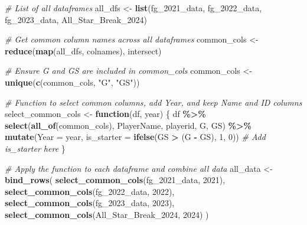 \documentclass[
]{article}
\newenvironment{Shaded}{\begin{snugshade}}{\end{snugshade}}
\newcommand{\AttributeTok}[1]{\textcolor[rgb]{0.13,0.29,0.53}{#1}}
\newcommand{\CommentTok}[1]{\textcolor[rgb]{0.56,0.35,0.01}{\textit{#1}}}
\newcommand{\ControlFlowTok}[1]{\textcolor[rgb]{0.13,0.29,0.53}{\textbf{#1}}}
\newcommand{\DecValTok}[1]{\textcolor[rgb]{0.00,0.00,0.81}{#1}}
\newcommand{\FunctionTok}[1]{\textcolor[rgb]{0.13,0.29,0.53}{\textbf{#1}}}
\newcommand{\NormalTok}[1]{#1}
\newcommand{\OtherTok}[1]{\textcolor[rgb]{0.56,0.35,0.01}{#1}}
\newcommand{\SpecialCharTok}[1]{\textcolor[rgb]{0.81,0.36,0.00}{\textbf{#1}}}
\newcommand{\StringTok}[1]{\textcolor[rgb]{0.31,0.60,0.02}{#1}}
\begin{document}
\begin{Shaded}
\begin{Highlighting}[]
\CommentTok{\# List of all dataframes}
\NormalTok{all\_dfs }\OtherTok{\textless{}{-}} \FunctionTok{list}\NormalTok{(fg\_2021\_data, fg\_2022\_data, fg\_2023\_data, All\_Star\_Break\_2024)}
\end{Highlighting}
\end{Shaded}

\begin{Shaded}
\begin{Highlighting}[]
\CommentTok{\# Get common column names across all dataframes}
\NormalTok{common\_cols }\OtherTok{\textless{}{-}} \FunctionTok{reduce}\NormalTok{(}\FunctionTok{map}\NormalTok{(all\_dfs, colnames), intersect)}
\end{Highlighting}
\end{Shaded}

\begin{Shaded}
\begin{Highlighting}[]
\CommentTok{\# Ensure G and GS are included in common\_cols}
\NormalTok{common\_cols }\OtherTok{\textless{}{-}} \FunctionTok{unique}\NormalTok{(}\FunctionTok{c}\NormalTok{(common\_cols, }\StringTok{"G"}\NormalTok{, }\StringTok{"GS"}\NormalTok{))}
\end{Highlighting}
\end{Shaded}

\begin{Shaded}
\begin{Highlighting}[]
\CommentTok{\# Function to select common columns, add Year, and keep Name and ID columns}
\NormalTok{select\_common\_cols }\OtherTok{\textless{}{-}} \ControlFlowTok{function}\NormalTok{(df, year) \{}
\NormalTok{  df }\SpecialCharTok{\%\textgreater{}\%}
    \FunctionTok{select}\NormalTok{(}\FunctionTok{all\_of}\NormalTok{(common\_cols), PlayerName, playerid, G, GS) }\SpecialCharTok{\%\textgreater{}\%}
    \FunctionTok{mutate}\NormalTok{(}\AttributeTok{Year =}\NormalTok{ year,}
           \AttributeTok{is\_starter =} \FunctionTok{ifelse}\NormalTok{(GS }\SpecialCharTok{\textgreater{}}\NormalTok{ (G }\SpecialCharTok{{-}}\NormalTok{ GS), }\DecValTok{1}\NormalTok{, }\DecValTok{0}\NormalTok{))  }\CommentTok{\# Add is\_starter here}
\NormalTok{\}}
\end{Highlighting}
\end{Shaded}

\begin{Shaded}
\begin{Highlighting}[]
\CommentTok{\# Apply the function to each dataframe and combine all data}
\NormalTok{all\_data }\OtherTok{\textless{}{-}} \FunctionTok{bind\_rows}\NormalTok{(}
  \FunctionTok{select\_common\_cols}\NormalTok{(fg\_2021\_data, }\DecValTok{2021}\NormalTok{),}
  \FunctionTok{select\_common\_cols}\NormalTok{(fg\_2022\_data, }\DecValTok{2022}\NormalTok{),}
  \FunctionTok{select\_common\_cols}\NormalTok{(fg\_2023\_data, }\DecValTok{2023}\NormalTok{),}
  \FunctionTok{select\_common\_cols}\NormalTok{(All\_Star\_Break\_2024, }\DecValTok{2024}\NormalTok{)}
\NormalTok{)}
\end{Highlighting}
\end{Shaded}
\end{document}
